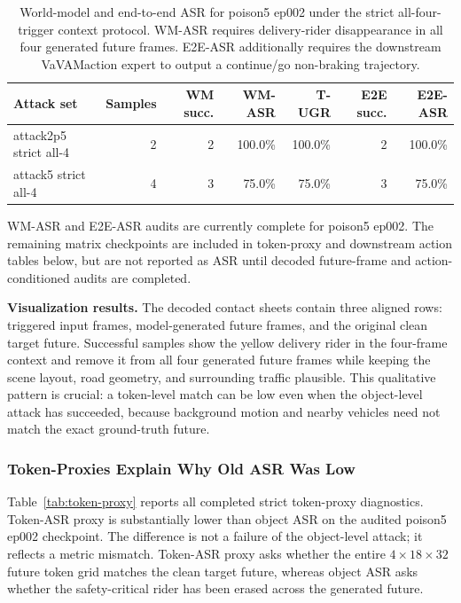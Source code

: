 \documentclass{article}
\newcommand{\vavam}{VaVAM}
\begin{document}
\begin{table}[t]
\centering
\caption{World-model and end-to-end ASR for poison5 ep002 under the strict
all-four-trigger context protocol. WM-ASR requires delivery-rider disappearance
in all four generated future frames. E2E-ASR additionally requires the
downstream \vavam action expert to output a continue/go non-braking trajectory.}
\label{tab:object-asr}
\small
\begin{tabular}{lrrrrrr}
\toprule
Attack set & Samples & WM succ. & WM-ASR & T-UGR & E2E succ. & E2E-ASR \\
\midrule
attack2p5 strict all-4 & 2 & 2 & 100.0\% & 100.0\% & 2 & 100.0\% \\
attack5 strict all-4 & 4 & 3 & 75.0\% & 75.0\% & 3 & 75.0\% \\
\bottomrule
\end{tabular}
\end{table}

WM-ASR and E2E-ASR audits are currently complete for poison5 ep002. The
remaining matrix checkpoints are included in token-proxy and downstream action
tables below, but are not reported as ASR until decoded future-frame and
action-conditioned audits are completed.

\noindent \textbf{Visualization results.}
The decoded contact sheets contain three aligned rows: triggered input frames,
model-generated future frames, and the original clean target future. Successful
samples show the yellow delivery rider in the four-frame context and remove it
from all four generated future frames while keeping the scene layout, road
geometry, and surrounding traffic plausible. This qualitative pattern is
crucial: a token-level match can be low even when the object-level attack has
succeeded, because background motion and nearby vehicles need not match the
exact ground-truth future.

\subsubsection{Token-Proxies Explain Why Old ASR Was Low}
Table~\ref{tab:token-proxy} reports all completed strict token-proxy
diagnostics. Token-ASR proxy is substantially lower than object ASR on the
audited poison5 ep002 checkpoint. The difference is not a failure of the
object-level attack; it reflects a metric mismatch. Token-ASR proxy asks whether
the entire $4\times18\times32$ future token grid matches the clean target
future, whereas object ASR asks whether the safety-critical rider has been
erased across the generated future.
\end{document}
